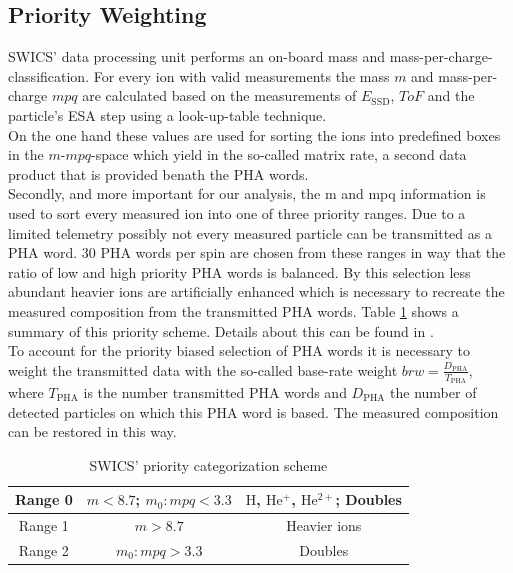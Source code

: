 \subsection{Priority Weighting}
\label{subsec:prio}
SWICS' data processing unit performs an on-board mass and mass-per\--charge-clas\-sification. For every ion with valid measurements the mass $m$ and mass-per-charge $mpq$ are calculated based on the measurements of $E_{\mathrm{SSD}}$, $ToF$ and the particle's ESA step using a look-up-table technique.\\
On the one hand these values are used for sorting the ions into predefined boxes in the $m$-$mpq$-space which yield in the so-called matrix rate, a second data product that is provided benath the PHA words.\\
Secondly, and more important for our analysis, the m and mpq information is used to sort every measured ion into one of three priority ranges. Due to a limited telemetry possibly not every measured particle can be transmitted as a PHA word. 
30 PHA words per spin are chosen from these ranges in way that the ratio of low and high priority PHA words is balanced. By this selection less abundant heavier ions are artificially enhanced which is necessary to recreate the measured composition from the transmitted PHA words. Table \ref{tab} shows a summary of this priority scheme. Details about this can be found in \citet{gloeckler_1992}.\\
To account for the priority biased selection of PHA words it is necessary to weight the transmitted data with the so-called base-rate weight $brw = \frac{D_{\mathrm{PHA}}}{T_{\mathrm{PHA}}}$, where $T_{\mathrm{PHA}}$ is the number transmitted PHA words and $D_{\mathrm{PHA}}$ the number of detected particles on which this PHA word is based. The measured composition can be restored in this way.
\begin{table}[h]
	\caption{SWICS' priority categorization scheme} 
	\centering
	\begin{tabular}{c|c|c}
		Range 0 & $m < 8.7$;  $m_0 : mpq < 3.3$ & $\mathrm{H}$, $\mathrm{He^+}$, $\mathrm{He^{2+}}$; Doubles\\ 
		\hline 
		Range 1 & $m > 8.7$ & Heavier ions \\ 
		\hline 
		Range 2 & $m_0 : mpq > 3.3$ & Doubles \\ 
	\end{tabular} 
	\label{tab}
\end{table}
%
%
%
